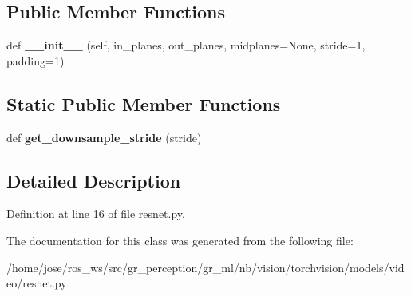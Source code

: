 \subsection*{Public Member Functions}
\begin{DoxyCompactItemize}
\item 
\mbox{\label{classtorchvision_1_1models_1_1video_1_1resnet_1_1Conv3DSimple_a25de2e1e004c379a9956a33832b33123}} 
def {\bfseries \+\_\+\+\_\+init\+\_\+\+\_\+} (self, in\+\_\+planes, out\+\_\+planes, midplanes=None, stride=1, padding=1)
\end{DoxyCompactItemize}
\subsection*{Static Public Member Functions}
\begin{DoxyCompactItemize}
\item 
\mbox{\label{classtorchvision_1_1models_1_1video_1_1resnet_1_1Conv3DSimple_aaf85af9138c20dfb0f7e7c59caa8fbae}} 
def {\bfseries get\+\_\+downsample\+\_\+stride} (stride)
\end{DoxyCompactItemize}


\subsection{Detailed Description}


Definition at line 16 of file resnet.\+py.



The documentation for this class was generated from the following file\+:\begin{DoxyCompactItemize}
\item 
/home/jose/ros\+\_\+ws/src/gr\+\_\+perception/gr\+\_\+ml/nb/vision/torchvision/models/video/resnet.\+py\end{DoxyCompactItemize}

